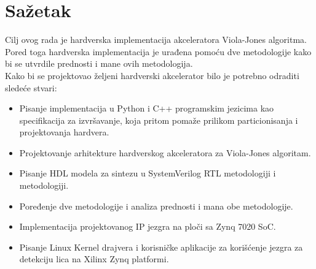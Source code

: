 \section{Sažetak}

Cilj ovog rada je hardverska implementacija akceleratora Viola-Jones algoritma. \\
Pored toga hardverska implementacija je urađena pomoću dve metodologije kako bi
se utvrdile prednosti i mane ovih metodologija. \\

\noindent
Kako bi se projektovao željeni hardverski akcelerator bilo je potrebno odraditi
sledeće stvari: \\
\begin{itemize}
  \item Pisanje implementacija u Python i C++ programskim jezicima kao
    specifikacija za izvršavanje, koja pritom pomaže prilikom particionisanja i projektovanja hardvera.
  \item Projektovanje arhitekture hardverskog akceleratora za Viola-Jones algoritam.
  \item Pisanje HDL modela za sintezu u SystemVerilog RTL metodologiji i
    \PyGears{} metodologiji.
  \item Poređenje dve metodologije i analiza prednosti i mana obe metodologije.
  \item Implementacija projektovanog IP jezgra na \ZTurn{} ploči sa Zynq
    7020 SoC.
  \item Pisanje Linux Kernel drajvera i korisničke aplikacije za korišćenje
    jezgra za detekciju lica na Xilinx Zynq platformi.

\end{itemize}